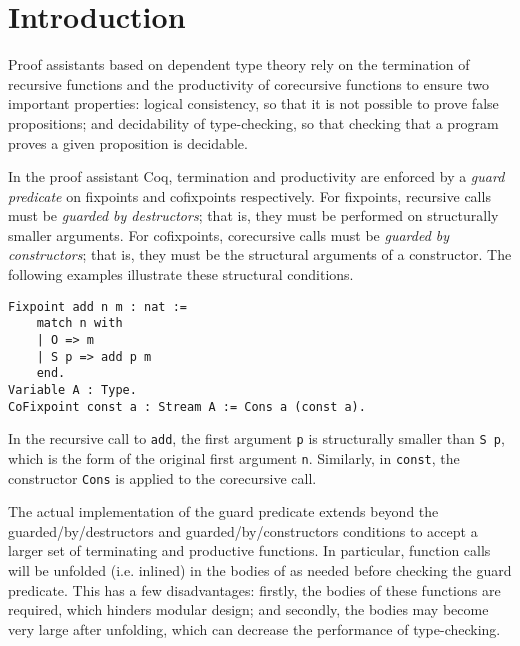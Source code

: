 \documentclass[sigplan,10pt,anonymous,review,nonacm]{acmart}
\begin{document}


\maketitle


\section{Introduction}

Proof assistants based on dependent type theory rely on the termination of recursive functions and the productivity of corecursive functions to ensure two important properties: logical consistency, so that it is not possible to prove false propositions; and decidability of type-checking, so that checking that a program proves a given proposition is decidable.

In the proof assistant Coq, termination and productivity are enforced by a \textit{guard predicate} on fixpoints and cofixpoints respectively. For fixpoints, recursive calls must be \textit{guarded by destructors}; that is, they must be performed on structurally smaller arguments. For cofixpoints, corecursive calls must be \textit{guarded by constructors}; that is, they must be the structural arguments of a constructor. The following examples illustrate these structural conditions.

\begin{verbatim}
Fixpoint add n m : nat :=
    match n with
    | O => m
    | S p => add p m
    end.
Variable A : Type.
CoFixpoint const a : Stream A := Cons a (const a).
\end{verbatim}

In the recursive call to \texttt{add}, the first argument \texttt{p} is structurally smaller than \texttt{S p}, which is the form of the original first argument \texttt{n}. Similarly, in \texttt{const}, the constructor \texttt{Cons} is applied to the corecursive call.

The actual implementation of the guard predicate extends beyond the guarded\-/by\-/destructors and guarded\-/by\-/constructors conditions to accept a larger set of terminating and productive functions. In particular, function calls will be unfolded (i.e. inlined) in the bodies of \cofixpoints as needed before checking the guard predicate. This has a few disadvantages: firstly, the bodies of these functions are required, which hinders modular design; and secondly, the \cofixpoint bodies may become very large after unfolding, which can decrease the performance of type-checking.
\end{document}

